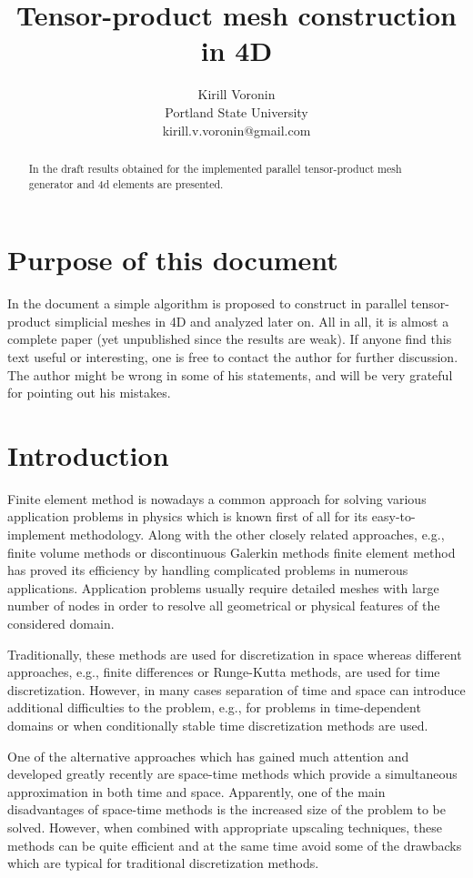 \documentclass[12pt]{article}
\title{Tensor-product mesh construction in 4D}
\author{Kirill Voronin \\
Portland State University \\
kirill.v.voronin@gmail.com}
\date{}
\begin{document}
\maketitle

\begin{abstract}
In the draft results obtained for the implemented parallel tensor-product mesh generator and 4d elements are presented.
\end{abstract}

\section*{Purpose of this document}
In the document a simple algorithm is proposed to construct in parallel tensor-product simplicial meshes in 4D and analyzed later on. All in all, it is almost a complete paper (yet unpublished since the results are weak).
If anyone find this text useful or interesting, one is free to contact the author for further discussion. The author might be wrong in some of his statements, and will be very grateful for pointing out his mistakes.


\section*{Introduction}

Finite element method is nowadays a common approach for solving various application problems in physics which is known first of all for its easy-to-implement methodology. Along with the other closely related approaches, e.g., finite volume methods or discontinuous Galerkin methods finite element method has proved its efficiency by handling complicated problems in numerous applications. Application problems usually require detailed meshes with large number of nodes in order to resolve all geometrical or physical features of the considered domain.

Traditionally, these methods are used for discretization in space whereas different approaches, e.g., finite differences or Runge-Kutta methods, are used for time discretization.
However, in many cases separation of time and space can introduce additional difficulties to the problem, e.g., for problems in time-dependent domains or when conditionally stable time discretization methods are used.  

One of the alternative approaches which has gained much attention and developed greatly recently are space-time methods which provide a simultaneous approximation in both time and space. Apparently, one of the main disadvantages of space-time methods is the increased size of the problem to be solved. However, when combined with appropriate upscaling techniques, these methods can be quite efficient and at the same time avoid some of the drawbacks which are typical for traditional discretization methods.
\end{document}
